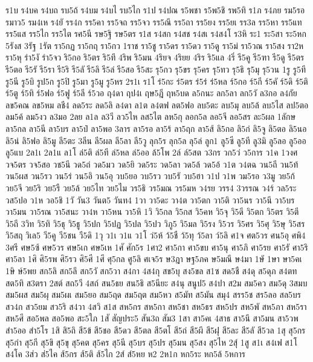 {ร1บ
ร4บค
ร4บถ
รบ5ถ้
ร4บม
ร4บไ
รบ5ไก
ร1ป
ร4ปณ
ร5พชา
ร5พ5ชิ
รพ5ทิ
ร1ภ
ร4ภย
รม5รอ
รมาว5
รม4เห
ร4ยั
รร4ก
รร5คา
รร5จถ
รร5จว
รร5ณึ
รร5ถา
รร5ยง
รร5ยเ
รร3ล
รร5หา
รร5แท
รร5แส
รร5ไก
รร5ไต
รศ5นี
รษ5ฐิ
รษ5ตร
ร1ส
ร4สก
ร4สช
ร4สเ
ร4ส4โ
ร3หิ
ระ1
ระ5สา
ระ5หก
5รังส
3รัฐ
1รัต
รา5กฏ
รา5กฤ
รา5กว
1ราช
รา5ชู
รา5ดร
รา5ดว
รา5ดู
รา5ม่
รา5วณ
รา5สง
รา2ห
รา5หุ
รำ5งั
รำ5จว
ริ5กอ
ริ5ตร
ริ5ทึ
4ริพ
ริ5มน
4ริยจ
4ริยย
4ริร
ริ5แล
4ริ่
รี5คู
รี5ฑา
รี5ดู
รี5ตร
รี5ตอ
รี5รั
รี5รา
รี5ริ
รี5ลั
รี5ลิ
รี5ล่
รี5สอ
รี5สะ
รุ5กว
รุ5ขร
รุ5คร
รุ5ทว
รุ5ธิ
รุ5มุ
รุ5วน
1รู
รู5ที
รู5นี
รู5บิ
รูป5ก
รู5ปิ
รู5มา
รู5มู
รู5หร
2ร1เ
ร1โ
ร่5กะ
ร่5ตร
ร่5ร่
ร่5หล
ร์5กอ
ร์5กี
ร์5คั
ร์5ดิ
ร์5ติ
ร์5ตู
ร์5ทิ
ร์5ฟอ
ร์5ฟู
ร์5ลี
ร์5วอ
ฤ4ดา
ฤป4เ
ฤษ5ฎี
ฤห5บด
ล5กนะ
ลก5ลา
ลก5วั
ล3กอ
ล4กัย
ลข5คณ
ลข5หม
ลชี4
ลด5ระ
ลด5ลิ
ล4ดา
ล1ต
ล4ตฟ
ลต5ฟอ
ลบ5ตะ
ลบ5มุ
ลบ5ล้
ลบ5ไส
ลป5ตอ
ลม5ค้
ลม5งว
ล3มอ
2ลย
ล1ล
ล3วี
ลว5ไห
ลส5ไต
ลห5กุ
ลอก5ล
ลอ5จี
ลอ5สร
ละ5ผล
1ลักษ
ลา5กล
ลา5นี
ลา5บร
ลา5ป๋
ลา5พอ
3ลาร
ลา5รอ
ลา5ร้
ลา5ฤก
ลา5ส้
ลิ5กอ
ลิ5ก่
ลิ5จู
ลิ5ตอ
ลิ5นอ
ลิ5น่
ลิ5ฟอ
ลิ5มู
ลี5ตะ
3ลีน
ลี5ผล
ลี5ลา
ลี5วู
ลุก5ร
ลุก5ล
ลุ5ล่
ลูก1
ลู5ซี
ลู5ที
ลู3มิ
ลู5ลอ
ลู5ออ
ลู5แบ
2ล1เ
2ล1แ
ล1โ
ล่5ติ
ล่5ที
ล่5หล
ล่5ออ
ล้5โพ
2ล์
ล์5สต
ว3กร
วก5ว่
ว5การ
ว1ค
1วงศ
วจ5ตร
วจ5สอ
วช5นี
วด5ถ่
วด5มว
วด5ยิ
วด5ระ
วด5ลา
วด5ล้
วด5อ้
ว1ต
ว4ตฉ
วน5ถี
วน5ท้
วน5ผส
วน5รว
วน5ร่
วน5อิ
วน5อุ
วบ5ยอ
วบ5รว
วบ5รั
วบ5ฮา
ว1ป
ว1พ
วม5รอ
ว3มู
วย5ก้
วย5จี
วย5ริ
วย5รื
วย5ล้
วย5ไท
วย5ไม
วร5ธิ
วร5มณ
วร5มห
ว4รย
วรร4
3วรรณ
ว4ร์
วล5ระ
วส5ปอ
ว1ห
วอ5ชิ
1วั
วัน3
วันต5
วันท4
1วา
วา5ดะ
วา4ต
วา5ตก
วา5ติ
วา5นร
วา5นึ
วา5บร
วา5มน
วา5รณ
วา5สนะ
วา4ห
วา5หน
วา5หิ
1วิ
วิ5กล
วิ5กส
วิ5คห
วิ5จุ
วิ5ดี
วิ5ตก
วิ5ตร
วิ5ตี
วิ5ถี
3วิท
วิ5ทิ
วิ5ธุ
วิ5ธู
วิ5ปก
วิ5ปฏ
วิ5ปล
วิ5ปว
วิภู5
วิ5มล
วิ5รง
วิ5วร
วิ5ศร
วิ5ศุ
วิ5ษุ
วิ5สร
วิ5สฤ
วิเล5
วี5คู
วี5ชน
วี5ดิ
1วุ
ว1เ
ว1แ
ว1โ
ว่5ห้
ว้5ชื
ว้5ทุ
ว้5ลา
ว์5ลิ
ศ1จ
ศต5วร
ศน5อุ
ศพิ4
3ศรี
ศษ5ซ้
ศษ5วร
ศษ5เก
ศษ5เห
1ศั
ศัก5ร
1ศา2
ศา5กา
ศา5ขบ
ศา5นุ
ศา5ภิ
ศา5รย
ศา5รั
ศา5ริ
ศา5ลา
1ศิ
ศิ5รพ
ศิ5รว
ศิ5ศี
1ศึ
ศุ5กล
ศู5ลิ
ศเจ5ร
ษ3ฎา
ษฐ5ภค
ษ5มณี
ษ4มา
1ษั
1ษา
ษา5คเ
1ษิ
ษ์5พย
สก5ลิ
สก5ลึ
สก5วั
สก5วา
ส4กา
4ส4กุ
สข5บุ
สง5ขล
ส1ซ
สด5ชื
ส4ดุ
ส5ดุภ
ส4ตท
สต5ทิ
ส3ตรา
2สต์
สถ5วี
4สถ์
สน5ธย
สน5ธิ
ส5นียะ
ส4นุ
สนูป5
ส4ปา
ส2ม
สม5คว
สม5ดุ
3สมบ
สม5ผส
สม5ผุ
สม5ผเ
สม5ยอ
สม5ฤด
สม5ฤต
สม5หว
ส5มัท
ส5มัน
สมุ4
สรร5ช
สร5ลอ
สล5บร
สว4ก
สว5ยม
สว5ริ
ส4วา
4สวิ
ส1ส
สห5กร
สห5กา
สห5ชา
สห5ธร
สห5ปร
สห5พั
สห5ภา
สห5รา
สห5ศึ
สอ5พล
สอ5พอ
สะ5ใภ
1สั
สัญประ5
สัน3ถ
สัม3
1สา
สา5คเ
4สาธ
สา5นึ
สา5มน
สา5วพ
สำ5ออ
สำ5โร
1สิ
สิ5ถิ
สี5ข้
สี5ชอ
สี5ดว
สี5ตล
สี5ตโ
สี5ถ่
สี5ผึ
สี5ฝุ
สี5ละ
สี5ลั
สี5วล
1สุ
สุ5กร
สุ5กำ
สุ5กี
สุ5ขิ
สุ5ขุ
สุ5คต
สุ5คร
สุ5นี
สุ5บร
สุ5ปร
สุ5มน
สุ5สง
สุ5ไห
2สุ์
1สู
ส1เ
ส4เฟ
ส1โ
ส4โค
3ส่ว
ส่5ไค
ส้5กร
ส้5ติ
ส้5ไก
2ส์
ส์5หย
ห2
2ห1ก
หก5ระ
หก5ล้
5หการ
}
